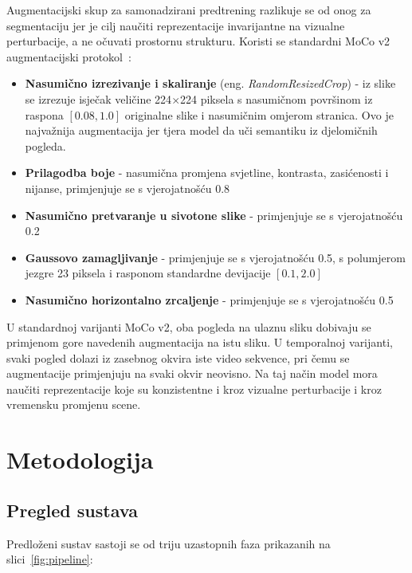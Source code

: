 \documentclass[diplomskirad]{fer}
\begin{document}
Augmentacijski skup za samonadzirani predtrening razlikuje se od onog za segmentaciju jer je cilj naučiti reprezentacije invarijantne na vizualne perturbacije, a ne očuvati prostornu strukturu. Koristi se standardni MoCo v2 augmentacijski protokol~\cite{chen2020improvedbaselinesmomentumcontrastive}:

\begin{itemize}
	\item \textbf{Nasumično izrezivanje i skaliranje} (eng. \textit{RandomResizedCrop}) - iz slike se izrezuje isječak veličine 224$\times$224 piksela s nasumičnom površinom iz raspona $[0.08, 1.0]$ originalne slike i nasumičnim omjerom stranica. Ovo je najvažnija augmentacija jer tjera model da uči semantiku iz djelomičnih pogleda.
	\item \textbf{Prilagodba boje} - nasumična promjena svjetline, kontrasta, zasićenosti i nijanse, primjenjuje se s vjerojatnošću 0.8
	\item \textbf{Nasumično pretvaranje u sivotone slike} - primjenjuje se s vjerojatnošću 0.2
	\item \textbf{Gaussovo zamagljivanje} - primjenjuje se s vjerojatnošću 0.5, s polumjerom jezgre 23 piksela i rasponom standardne devijacije $[0.1, 2.0]$
	\item \textbf{Nasumično horizontalno zrcaljenje} - primjenjuje se s vjerojatnošću 0.5
\end{itemize}

U standardnoj varijanti MoCo v2, oba pogleda na ulaznu sliku dobivaju se primjenom gore navedenih augmentacija na istu sliku. U temporalnoj varijanti, svaki pogled dolazi iz zasebnog okvira iste video sekvence, pri čemu se augmentacije primjenjuju na svaki okvir neovisno. Na taj način model mora naučiti reprezentacije koje su konzistentne i kroz vizualne perturbacije i kroz vremensku promjenu scene.




\chapter{Metodologija}
\label{pog:metodologija}

\section{Pregled sustava}
\label{sec:pregled_sustava}

Predloženi sustav sastoji se od triju uzastopnih faza prikazanih na slici~\ref{fig:pipeline}:
\end{document}
